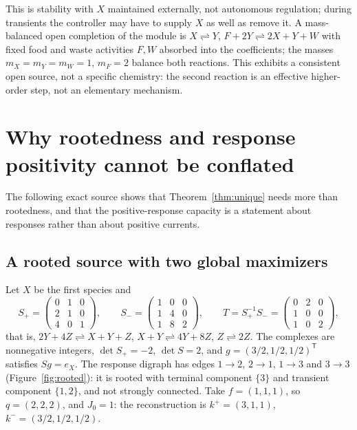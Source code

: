 \documentclass[11pt,a4paper]{article}
\theoremstyle{plain}
\theoremstyle{definition}
\theoremstyle{remark}
\numberwithin{equation}{section}
\newcommand{\T}{\mathsf{T}}
\newcommand{\Sp}{S_{+}}
\newcommand{\Sm}{S_{-}}
\begin{document}
This is stability with $X$ maintained externally, not autonomous regulation; during transients the controller may have to supply $X$ as well as remove it. A mass-balanced open completion of the module is $X\rightleftharpoons Y$, $F+2Y\rightleftharpoons2X+Y+W$ with fixed food and waste activities $F,W$ absorbed into the coefficients; the masses $m_X=m_Y=m_W=1$, $m_F=2$ balance both reactions. This exhibits a consistent open source, not a specific chemistry: the second reaction is an effective higher-order step, not an elementary mechanism.

\section{Why rootedness and response positivity cannot be conflated}\label{sec:rooted}

The following exact source shows that Theorem~\ref{thm:unique} needs more than rootedness, and that the positive-response capacity is a statement about responses rather than about positive currents.

\subsection{A rooted source with two global maximizers}
Let $X$ be the first species and
\begin{equation}\label{eq:countermatrices}
 \Sp=\begin{pmatrix}0&1&0\\2&1&0\\4&0&1\end{pmatrix},\qquad
 \Sm=\begin{pmatrix}1&0&0\\1&4&0\\1&8&2\end{pmatrix},\qquad
 T=\Sp^{-1}\Sm=\begin{pmatrix}0&2&0\\1&0&0\\1&0&2\end{pmatrix},
\end{equation}
that is, $2Y+4Z\rightleftharpoons X+Y+Z$, $X+Y\rightleftharpoons4Y+8Z$, $Z\rightleftharpoons2Z$. The complexes are nonnegative integers, $\det\Sp=-2$, $\det S=2$, and $g=(3/2,1/2,1/2)^{\T}$ satisfies $Sg=e_X$. The response digraph has edges $1\to2$, $2\to1$, $1\to3$ and $3\to3$ (Figure~\ref{fig:rooted}): it is rooted with terminal component $\{3\}$ and transient component $\{1,2\}$, and not strongly connected. Take $f=(1,1,1)$, so $q=(2,2,2)$, and $J_0=1$: the reconstruction is $k^+=(3,1,1)$, $k^-=(3/2,1/2,1/2)$.
\end{document}
